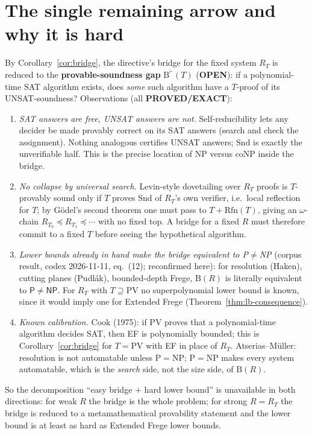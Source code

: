 \documentclass[11pt]{article}
\theoremstyle{definition}
\begin{document}
\section{The single remaining arrow and why it is hard}
By Corollary~\ref{cor:bridge}, the directive's bridge for the fixed system $R_T$ is
reduced to the \textbf{provable-soundness gap} $\mathrm{B}^{\vdash}(T)$ (\textbf{OPEN}):
if a polynomial-time SAT algorithm exists, does \emph{some} such algorithm have a
$T$-proof of its UNSAT-soundness? Observations (all \textbf{PROVED/EXACT}):
\begin{enumerate}
\item \emph{SAT answers are free, UNSAT answers are not.} Self-reducibility lets any
 decider be made provably correct on its SAT answers (search and check the
 assignment). Nothing analogous certifies UNSAT answers; $\mathrm{Snd}$ is exactly
 the unverifiable half. This is the precise location of NP versus coNP inside the
 bridge.
\item \emph{No collapse by universal search.} Levin-style dovetailing over $R_T$
 proofs is $T$-provably sound only if $T$ proves $\mathrm{Snd}$ of $R_T$'s own
 verifier, i.e.\ local reflection for $T$; by G\"odel's second theorem one must
 pass to $T+\mathrm{Rfn}(T)$, giving an $\omega$-chain $R_{T_0}\preceq R_{T_1}
 \preceq\cdots$ with no fixed top. A bridge for a fixed $R$ must therefore commit to
 a fixed $T$ before seeing the hypothetical algorithm.
\item \emph{Lower bounds already in hand make the bridge equivalent to P$\neq$NP}
 (corpus result, codex 2026-11-11, eq.~(12); reconfirmed here): for resolution
 (Haken), cutting planes (Pudl\'ak), bounded-depth Frege, $\mathrm B(R)$ is literally
 equivalent to $\mathsf P\neq\mathsf{NP}$. For $R_T$ with $T\supseteq\mathrm{PV}$ no
 superpolynomial lower bound is known, since it would imply one for Extended Frege
 (Theorem~\ref{thm:lb-consequence}).
\item \emph{Known calibration.} Cook (1975): if PV proves that a polynomial-time
 algorithm decides SAT, then EF is polynomially bounded; this is
 Corollary~\ref{cor:bridge} for $T=\mathrm{PV}$ with EF in place of $R_T$.
 Atserias--M\"uller: resolution is not automatable unless P$=$NP; P$=$NP makes every
 system automatable, which is the \emph{search} side, not the size side, of
 $\mathrm B(R)$.
\end{enumerate}
So the decomposition ``easy bridge $+$ hard lower bound'' is unavailable in both
directions: for weak $R$ the bridge is the whole problem; for strong $R=R_T$ the
bridge is reduced to a metamathematical provability statement and the lower bound
is at least as hard as Extended Frege lower bounds.
\end{document}
